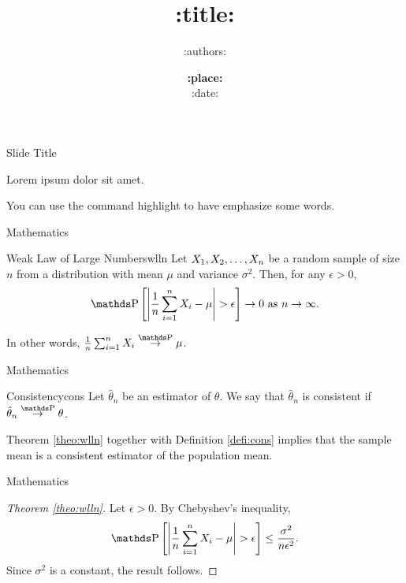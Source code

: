 \documentclass[xcolor=dvipsnames,t,aspectratio=169]{beamer} %
\title{:title:}
\author{
    :authors:
}
\date{{\color{fgv_dark_blue}  \textbf{:place:}\\ :date: }}
\newcommand{\highlight}[1]{{\color{fgv_light_blue} #1}}
\begin{document}
\frame[plain]{\titlepage}
\setcounter{framenumber}{0}

\begin{frame}[c]{Slide Title}

    Lorem ipsum dolor sit amet.

    \begin{display}
    You can use the command \highlight{highlight} to have \highlight{emphasize} some words.
    \end{display}


\end{frame}

\begin{frame}[c]{Mathematics}

    \begin{theo}{Weak Law of Large Numbers}{wlln} %
        Let $X_1, X_2, \ldots, X_n$ be a random sample of size $n$ from a distribution with mean $\mu$ and variance $\sigma^2$. Then, for any $\epsilon > 0$,
        \begin{equation*}
            \pr\left[\left|\frac{1}{n}\sum_{i=1}^n X_i - \mu\right| > \epsilon\right] \to 0 \text{ as } n \to \infty.
        \end{equation*}

        In other words, $\frac{1}{n}\sum_{i=1}^n X_i \probto \mu$.
    \end{theo}
    
\end{frame}

\begin{frame}[c]{Mathematics}
    
        \begin{defi}{Consistency}{cons}
            Let $\hat{\theta}_n$ be an estimator of $\theta$. We say that $\hat{\theta}_n$ is \highlight{consistent} if $\hat{\theta}_n \probto \theta$.
        \end{defi}
    
        \begin{remark}{}{}
            Theorem \ref{theo:wlln} together with Definition \ref{defi:cons} implies that the sample mean is a consistent estimator of the population mean.
        \end{remark}
    
\end{frame}

\begin{frame}[c]{Mathematics}
    \begin{proof}[Theorem \ref{theo:wlln}] %
        Let $\epsilon > 0$. By Chebyshev's inequality,
        \begin{equation*}
            \pr\left[\left|\frac{1}{n}\sum_{i=1}^n X_i - \mu\right| > \epsilon\right] \leq \frac{\sigma^2}{n\epsilon^2}.
        \end{equation*}
        Since $\sigma^2$ is a constant, the result follows.
        
    \end{proof}
    
\end{frame}
\end{document}

